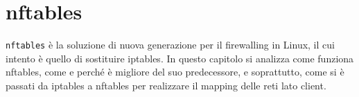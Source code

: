 \chapter{nftables}

\texttt{nftables} è la soluzione di nuova generazione per il firewalling in
Linux, il cui intento è quello di sostituire iptables.
In questo capitolo si analizza come funziona nftables, come e perché è migliore
del suo predecessore, e soprattutto, come si è passati da iptables a nftables
per realizzare il mapping delle reti lato client.






